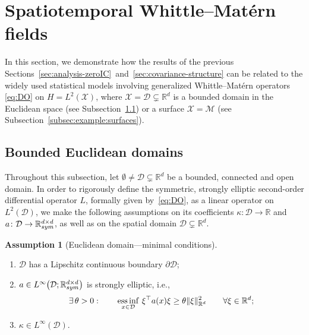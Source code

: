 \documentclass[reqno]{amsart}
\numberwithin{equation}{section}
\newcommand{\R}{\mathbb{R}}
\newcommand{\cD}{\mathcal{D}}
\newcommand{\cM}{\mathcal{M}}
\newcommand{\cX}{\mathcal{X}}
\newcommand{\norm}[2]{     \| #1       \|_{ #2 }}
\newcommand{\from}{\colon}
\theoremstyle{remark}
\theoremstyle{definition}
\newtheorem{assumption}[lemma]{Assumption}
\begin{document}
\section{Spatiotemporal Whittle--Mat\'ern fields}
\label{sec:Whittle-Matern} 

In this section, 
we demonstrate how the results of the previous  
Sections~\ref{sec:analysis-zeroIC}~and~\ref{sec:covariance-structure} 
can be related to the widely used statistical models 
involving generalized Whittle--Mat\'ern operators \eqref{eq:DO} 
on ${H = L^2(\cX)}$,
where $\cX=\cD\subsetneq\R^d$ is a bounded domain 
in the Euclidean space 
(see Subsection~\ref{subsec:example:bdd-euclidean})
or a surface $\cX=\cM$ 
(see Subsection~\ref{subsec:example:surfaces}).

\subsection{Bounded Euclidean domains}
\label{subsec:example:bdd-euclidean}

Throughout this subsection, let 
${\emptyset \neq \cD \subsetneq \R^d}$ 
be a bounded, 
connected and open 
domain.  
In order to rigorously define the 
symmetric, strongly elliptic second-order  
differential operator $L$,
formally given by~\eqref{eq:DO},
as a linear operator on $L^2(\cD)$,
we make the following assumptions 
on its coefficients  
$\kappa\from \cD \to \R$ and 
$a\from \cD\to\R^{d\times d}_{\rm sym}$, 
as well as on the spatial domain 
$\cD\subsetneq \R^d$. 

\begin{assumption}[Euclidean domain---minimal conditions]\label{assumption:minimal}
	\ 
	
	\begin{enumerate}[label=(\roman*), leftmargin=1cm] 
		\item\label{assumption:minimal-D} 
		$\cD$ has a Lipschitz continuous boundary $\partial\cD$;
		\item\label{assumption:minimal-a} 
		$a \in L^\infty\bigl( \cD; \R^{d\times d}_{\rm sym} \bigr)$ 
		is strongly elliptic, i.e., 
		\[ 
		\exists \, \theta > 0 : 
		\qquad 
		\operatornamewithlimits{ess\,inf}_{x\in \cD} \, \xi^\top a(x) \xi \geq \theta \norm{\xi}{\R^d}^2
		\qquad
		\forall \xi \in \R^d;
		\] 
		\item\label{assumption:minimal-kappa}  
		$\kappa \in L^\infty(\cD)$. 
	\end{enumerate}
\end{assumption}
%
\end{document}
